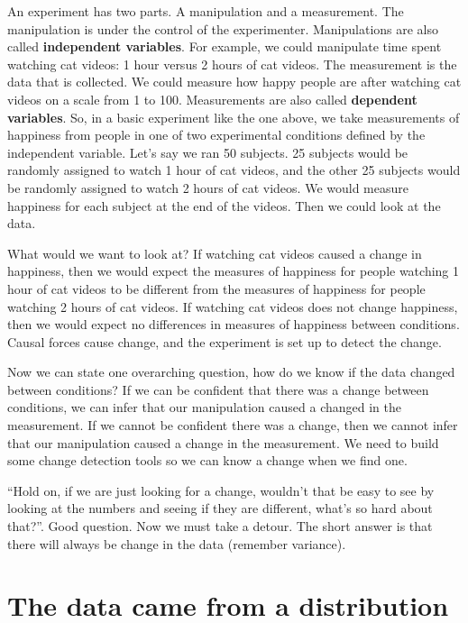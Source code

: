 \documentclass[
  letterpaper,
  DIV=11,
  numbers=noendperiod]{scrreprt}
\begin{document}
An experiment has two parts. A manipulation and a measurement. The
manipulation is under the control of the experimenter. Manipulations are
also called \textbf{independent variables}. For example, we could
manipulate time spent watching cat videos: 1 hour versus 2 hours of cat
videos. The measurement is the data that is collected. We could measure
how happy people are after watching cat videos on a scale from 1 to 100.
Measurements are also called \textbf{dependent variables}. So, in a
basic experiment like the one above, we take measurements of happiness
from people in one of two experimental conditions defined by the
independent variable. Let's say we ran 50 subjects. 25 subjects would be
randomly assigned to watch 1 hour of cat videos, and the other 25
subjects would be randomly assigned to watch 2 hours of cat videos. We
would measure happiness for each subject at the end of the videos. Then
we could look at the data.

What would we want to look at? If watching cat videos caused a change in
happiness, then we would expect the measures of happiness for people
watching 1 hour of cat videos to be different from the measures of
happiness for people watching 2 hours of cat videos. If watching cat
videos does not change happiness, then we would expect no differences in
measures of happiness between conditions. Causal forces cause change,
and the experiment is set up to detect the change.

Now we can state one overarching question, how do we know if the data
changed between conditions? If we can be confident that there was a
change between conditions, we can infer that our manipulation caused a
changed in the measurement. If we cannot be confident there was a
change, then we cannot infer that our manipulation caused a change in
the measurement. We need to build some change detection tools so we can
know a change when we find one.

``Hold on, if we are just looking for a change, wouldn't that be easy to
see by looking at the numbers and seeing if they are different, what's
so hard about that?''. Good question. Now we must take a detour. The
short answer is that there will always be change in the data (remember
variance).

\section{The data came from a
distribution}\label{the-data-came-from-a-distribution}
\end{document}
